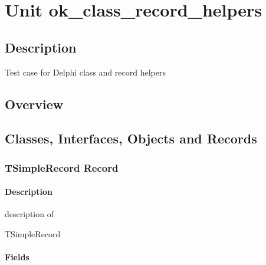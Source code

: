 \documentclass{report}
\begin{document}
\newlength{\tmplength}
\chapter{Unit ok{\_}class{\_}record{\_}helpers}
\section{Description}
Test case for Delphi class and record helpers
\section{Overview}
\begin{description}
\item[\texttt{\begin{ttfamily}TSimpleRecord\end{ttfamily} Record}]
\item[\texttt{\begin{ttfamily}TMyRecordHelper\end{ttfamily} Record}]
\item[\texttt{\begin{ttfamily}TAncestorClassHelper\end{ttfamily} Class}]
\item[\texttt{\begin{ttfamily}TDescendantClassHelper\end{ttfamily} Class}]
\end{description}
\section{Classes, Interfaces, Objects and Records}
\subsection*{TSimpleRecord Record}
\subsubsection*{\large{\textbf{Description}}\normalsize\hspace{1ex}\hfill}
description of \begin{ttfamily}TSimpleRecord\end{ttfamily}\subsubsection*{\large{\textbf{Fields}}\normalsize\hspace{1ex}\hfill}
\end{document}
